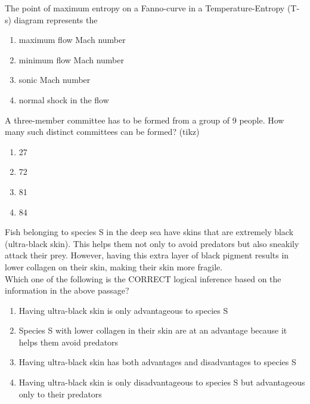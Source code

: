     \item {
    	The point of maximum entropy on a Fanno-curve in a Temperature-Entropy (T-s)
    	diagram represents the 
    	\begin{multicols}{2}
	    	\begin{enumerate}
	    		\item maximum flow Mach number
	    		\item minimum flow Mach number
	    		\item sonic Mach number
	    		\item normal shock in the flow 
	    	\end{enumerate}
	    \end{multicols}
    
    }    
    \item {A three-member committee has to be formed from a group of 9 people. How many such distinct committees can be formed? (tikz)
    	\begin{multicols}{4}
	    	\begin{enumerate}
	    		\item 27
	    		\item 72
	    		\item 81
	    		\item 84
	    	\end{enumerate}
    	\end{multicols}}
    \item {
    	Fish belonging to species S in the deep sea have skins that are extremely black
    	(ultra-black skin). This helps them not only to avoid predators but also sneakily
    	attack their prey. However, having this extra layer of black pigment results in
    	lower collagen on their skin, making their skin more fragile. \\
    	Which one of the following is the CORRECT logical inference based on the
    	information in the above passage? 
    		\begin{enumerate}
    			\item Having ultra-black skin is only advantageous to species S
    			\item Species S with lower collagen in their skin are at an advantage because it helps
    			them avoid predators
    			\item Having ultra-black skin has both advantages and disadvantages to species S
    			\item Having ultra-black skin is only disadvantageous to species S but advantageous
    			only to their predators 
    		\end{enumerate}
	}
